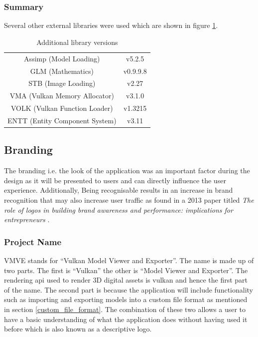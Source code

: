 \documentclass[11pt]{article}
\begin{document}
\subsubsection{Summary}
Several other external libraries were used which are shown in figure
\ref{tab:library_versions}. 

\begin{table}[H]
  \begin{center}
    \begin{tabular}{cc}
      
      \rowcolor{gray!50}
      Assimp (Model Loading) &  v5.2.5\\
      GLM (Mathematics) &  v0.9.9.8\\
      STB (Image Loading) &  v2.27 \\
      VMA (Vulkan Memory Allocator) &  v3.1.0 \\
      VOLK (Vulkan Function Loader) & v1.3215 \\
      ENTT (Entity Component System) & v3.11 \\
    \end{tabular}
  \end{center}
  \caption{Additional library versions}
  \label{tab:library_versions}
\end{table}

\subsection{Branding}
The branding i.e. the look of the application was an important factor during the
design as it will be presented to users and can directly influence the user
experience. Additionally, Being recognisable results in an increase in brand
recognition that may also increase user traffic as found in a 2013 paper titled
\textit{The role of logos in building brand awareness and performance:
implications for entrepreneurs} \cite{girard2013role}.

\subsubsection{Project Name}
VMVE stands for ``Vulkan Model Viewer and Exporter''. The name is made up of two
parts. The first is ``Vulkan'' the other is ``Model Viewer and Exporter''. The
rendering \gls*{api} used to render 3D digital assets is \gls*{vulkan} and hence
the first part of the name. The second part is because the application will
include functionality such as importing and exporting models into a custom file
format as mentioned in section \ref{custom_file_format}. The combination of
these two allows a user to have a basic understanding of what the application
does without having used it before which is also known as a descriptive logo.
\end{document}
